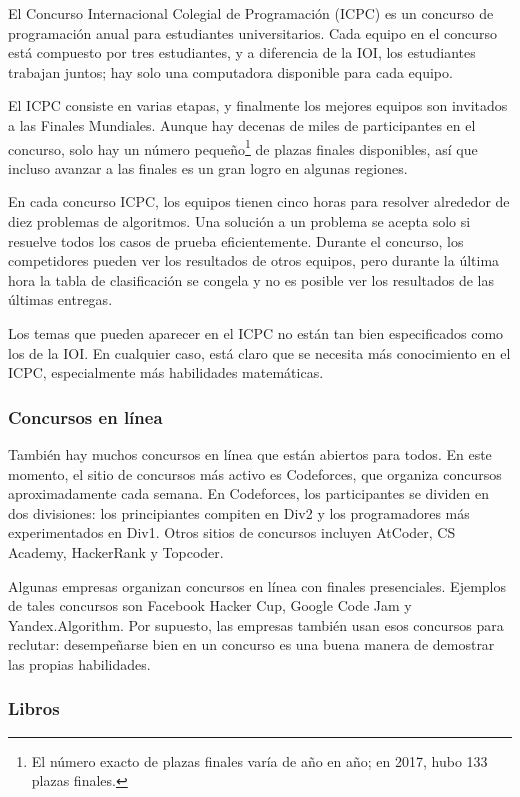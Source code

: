 El Concurso Internacional Colegial de Programación (ICPC)
es un concurso de programación anual para estudiantes universitarios.
Cada equipo en el concurso está compuesto por tres estudiantes,
y a diferencia de la IOI, los estudiantes trabajan juntos;
hay solo una computadora disponible para cada equipo.

El ICPC consiste en varias etapas, y finalmente los
mejores equipos son invitados a las Finales Mundiales.
Aunque hay decenas de miles de participantes
en el concurso, solo hay un número pequeño\footnote{El número exacto de plazas finales varía de año en año; en 2017, hubo 133 plazas finales.} de plazas finales disponibles,
así que incluso avanzar a las finales
es un gran logro en algunas regiones.

En cada concurso ICPC, los equipos tienen cinco horas para
resolver alrededor de diez problemas de algoritmos.
Una solución a un problema se acepta solo si resuelve
todos los casos de prueba eficientemente.
Durante el concurso, los competidores pueden ver los resultados de otros equipos,
pero durante la última hora la tabla de clasificación se congela y no
es posible ver los resultados de las últimas entregas.

Los temas que pueden aparecer en el ICPC no están tan bien
especificados como los de la IOI.
En cualquier caso, está claro que se necesita más conocimiento
en el ICPC, especialmente más habilidades matemáticas.

\subsubsection{Concursos en línea}

También hay muchos concursos en línea que están abiertos para todos.
En este momento, el sitio de concursos más activo es Codeforces,
que organiza concursos aproximadamente cada semana.
En Codeforces, los participantes se dividen en dos divisiones:
los principiantes compiten en Div2 y los programadores más experimentados en Div1.
Otros sitios de concursos incluyen AtCoder, CS Academy, HackerRank y Topcoder.

Algunas empresas organizan concursos en línea con finales presenciales.
Ejemplos de tales concursos son Facebook Hacker Cup,
Google Code Jam y Yandex.Algorithm.
Por supuesto, las empresas también usan esos concursos para reclutar:
desempeñarse bien en un concurso es una buena manera de demostrar las propias habilidades.

\subsubsection{Libros}

